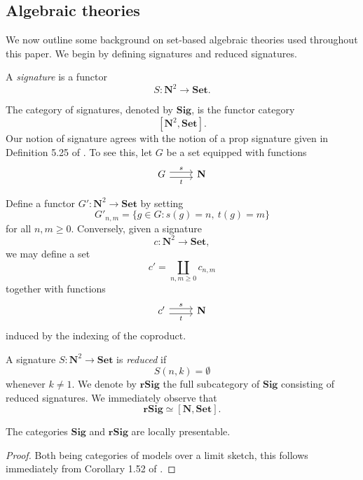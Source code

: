 \documentclass{tac}
\begin{document}

\subsection*{Algebraic theories}

We now outline some background on set-based algebraic theories used throughout this paper. We begin by defining signatures and reduced signatures.

\begin{definition}
A \emph{signature} is a functor
\[
S:\mathbf{N}^{2}\to \mathbf{Set}.
\]
\end{definition}

The category of signatures, denoted by $\mathbf{Sig}$, is the functor category
\[
[\mathbf{N}^{2},\mathbf{Set}].
\]
Our notion of signature agrees with the notion of a prop signature given in Definition 5.25 of \cite{FongSpivak2019}. To see this, let $G$ be a set equipped with functions
\[
\begin{tikzcd}
G
  \arrow[r, shift left=0.6ex, "s"]
  \arrow[r, shift right=0.6ex, swap, "t"]
&
\mathbf{N}
\end{tikzcd}
\]


Define a functor $G':\mathbf{N}^{2}\to\mathbf{Set}$ by setting
\[
G'_{n,m}=\{g\in G:s(g)=n,\ t(g)=m\}
\]
for all $n,m\geq 0$. Conversely, given a signature
\[
c:\mathbf{N}^{2}\to\mathbf{Set},
\]
we may define a set
\[
c'=\coprod_{n,m\geq 0}c_{n,m}
\]
together with functions
\[
\begin{tikzcd}
c'
  \arrow[r, shift left=0.6ex, "s"]
  \arrow[r, shift right=0.6ex, swap, "t"]
&
\mathbf{N}
\end{tikzcd}
\]
induced by the indexing of the coproduct.

A signature $S:\mathbf{N}^{2}\to\mathbf{Set}$ is \emph{reduced} if
\[
S(n,k)=\emptyset
\]
whenever $k\neq 1$. We denote by $\mathbf{rSig}$ the full subcategory of $\mathbf{Sig}$ consisting of reduced signatures. We immediately observe that
\[
\mathbf{rSig}\simeq [\mathbf{N},\mathbf{Set}].
\]

\begin{lemma}
The categories $\mathbf{Sig}$ and $\mathbf{rSig}$ are locally presentable.
\end{lemma}

\begin{proof}
Both being categories of models over a limit sketch, this follows immediately from Corollary 1.52 of \cite{AdRo}.
\end{proof}
\end{document}
